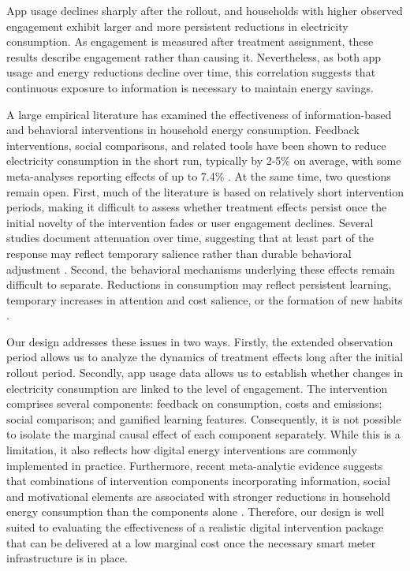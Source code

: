 App usage declines sharply after the rollout, and households with higher observed engagement exhibit larger and more persistent reductions in electricity consumption. As engagement is measured after treatment assignment, these results describe engagement rather than causing it. Nevertheless, as both app usage and energy reductions decline over time, this correlation suggests that continuous exposure to information is necessary to maintain energy savings. 

A large empirical literature has examined the effectiveness of information-based and behavioral interventions in household energy consumption. Feedback interventions, social comparisons, and related tools have been shown to reduce electricity consumption in the short run, typically by 2-5\% on average, with some meta-analyses reporting effects of up to 7.4\% \citep{abrahamseReviewInterventionStudies2005,delmasInformationStrategiesEnergy2013,karlinEffectsFeedbackEnergy2015,andorBehavioralEconomicsEnergy2018,khannaMulticountryMetaanalysisRole2021,khannaBehavioralInformationMonetary2025}. At the same time, two questions remain open. First, much of the literature is based on relatively short intervention periods, making it difficult to assess whether treatment effects persist once the initial novelty of the intervention fades or user engagement declines. Several studies document attenuation over time, suggesting that at least part of the response may reflect temporary salience rather than durable behavioral adjustment \citep{allcottShortrunLongrunEffects2014}. Second, the behavioral mechanisms underlying these effects remain difficult to separate. Reductions in consumption may reflect persistent learning, temporary increases in attention and cost salience, or the formation of new habits \citep{lynhamWhyDoesRealtime2016,tiefenbeckOvercomingSalienceBias2018}.

Our design addresses these issues in two ways. Firstly, the extended observation period allows us to analyze the dynamics of treatment effects long after the initial rollout period. Secondly, app usage data allows us to establish whether changes in electricity consumption are linked to the level of engagement. The intervention comprises several components: feedback on consumption, costs and emissions; social comparison; and gamified learning features. Consequently, it is not possible to isolate the marginal causal effect of each component separately. While this is a limitation, it also reflects how digital energy interventions are commonly implemented in practice. Furthermore, recent meta-analytic evidence suggests that combinations of intervention components incorporating information, social and motivational elements are associated with stronger reductions in household energy consumption than the components alone \citep{khannaMulticountryMetaanalysisRole2021,khannaBehavioralInformationMonetary2025}. Therefore, our design is well suited to evaluating the effectiveness of a realistic digital intervention package that can be delivered at a low marginal cost once the necessary smart meter infrastructure is in place.


